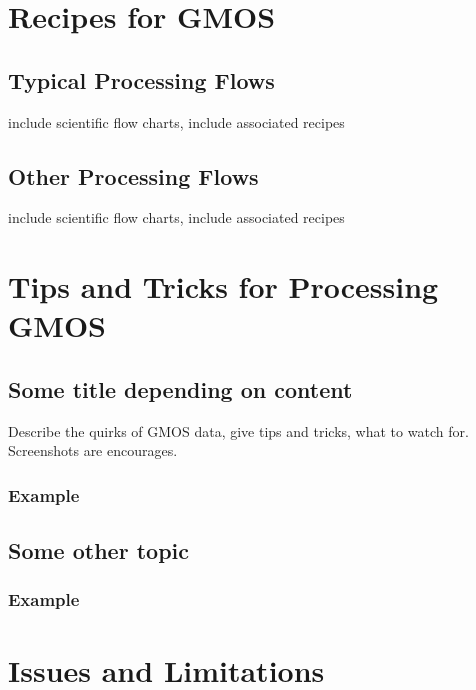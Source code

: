 \documentclass[letterpaper,10pt,english]{sphinxmanual}
\begin{document}
\section{Recipes for GMOS}
\label{GMOS/recipes:gmos-recipes-and-flows}\label{GMOS/recipes::doc}\label{GMOS/recipes:recipes-for-gmos}

\subsection{Typical Processing Flows}
\label{GMOS/recipes:typical-processing-flows}
include scientific flow charts, include associated recipes


\subsection{Other Processing Flows}
\label{GMOS/recipes:other-processing-flows}
include scientific flow charts, include associated recipes


\section{Tips and Tricks for Processing GMOS}
\label{GMOS/tipstricks:tips-and-tricks-for-processing-gmos}\label{GMOS/tipstricks:gmos-tips-tricks}\label{GMOS/tipstricks::doc}

\subsection{Some title depending on content}
\label{GMOS/tipstricks:some-title-depending-on-content}
Describe the quirks of GMOS data, give tips
and tricks, what to watch for.  Screenshots are encourages.


\subsubsection{Example}
\label{GMOS/tipstricks:example}

\subsection{Some other topic}
\label{GMOS/tipstricks:some-other-topic}

\subsubsection{Example}
\label{GMOS/tipstricks:id1}

\section{Issues and Limitations}
\label{GMOS/issueslimitations:gmos-issues-limitations}\label{GMOS/issueslimitations::doc}\label{GMOS/issueslimitations:issues-and-limitations}
\end{document}
